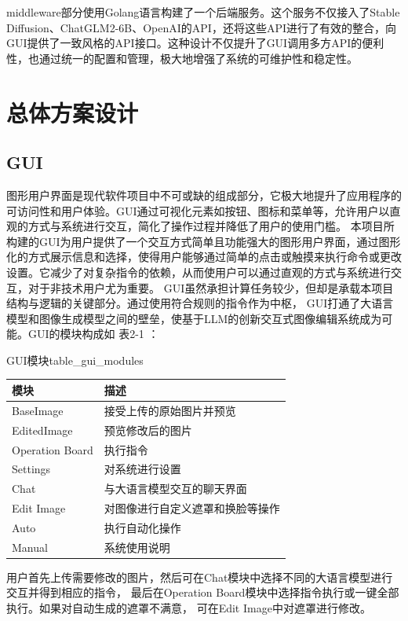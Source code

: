 \documentclass[a4paper,AutoFakeBold,oneside,12pt]{book}
\begin{document}
middleware部分使用Golang语言构建了一个后端服务。这个服务不仅接入了Stable Diffusion、ChatGLM2-6B、OpenAI的API，还将这些API进行了有效的整合，向GUI提供了一致风格的API接口。这种设计不仅提升了GUI调用多方API的便利性，也通过统一的配置和管理，极大地增强了系统的可维护性和稳定性。

\chapter{总体方案设计} %
\section{GUI}
图形用户界面是现代软件项目中不可或缺的组成部分，它极大地提升了应用程序的可访问性和用户体验。GUI通过可视化元素如按钮、图标和菜单等，允许用户以直观的方式与系统进行交互，简化了操作过程并降低了用户的使用门槛。
本项目所构建的GUI为用户提供了一个交互方式简单且功能强大的图形用户界面，通过图形化的方式展示信息和选择，使得用户能够通过简单的点击或触摸来执行命令或更改设置。它减少了对复杂指令的依赖，从而使用户可以通过直观的方式与系统进行交互，对于非技术用户尤为重要。
GUI虽然承担计算任务较少，但却是承载本项目结构与逻辑的关键部分。通过使用符合规则的指令作为中枢，
GUI打通了大语言模型和图像生成模型之间的壁垒，使基于LLM的创新交互式图像编辑系统成为可能。GUI的模块构成如 表2-1 ：
\begin{bupttable}{GUI模块}{table_gui_modules}
    \begin{tabular}{|l|l|}
        \hline \textbf{模块} & \textbf{描述} \\
        \hline BaseImage & 接受上传的原始图片并预览  \\
        \hline EditedImage & 预览修改后的图片 \\
        \hline Operation Board & 执行指令  \\
		\hline Settings & 对系统进行设置  \\
		\hline Chat & 与大语言模型交互的聊天界面  \\
		\hline Edit Image & 对图像进行自定义遮罩和换脸等操作  \\
		\hline Auto & 执行自动化操作  \\
		\hline Manual & 系统使用说明  \\
        \hline
    \end{tabular}
\end{bupttable}

用户首先上传需要修改的图片，然后可在Chat模块中选择不同的大语言模型进行交互并得到相应的指令，
最后在Operation Board模块中选择指令执行或一键全部执行。如果对自动生成的遮罩不满意，
可在Edit Image中对遮罩进行修改。
\end{document}
